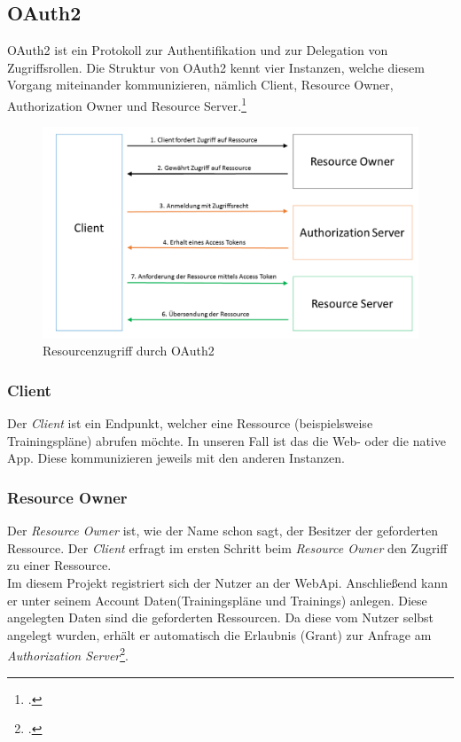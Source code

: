 \subsection{OAuth2}
\label{ssec:oauth2}
OAuth2 ist ein Protokoll zur Authentifikation und zur Delegation von Zugriffsrollen. Die Struktur von OAuth2 kennt vier Instanzen, welche diesem Vorgang miteinander kommunizieren, nämlich Client, Resource Owner, Authorization Owner und Resource Server.\footcite[S. 286]{book:AngularJs:Steyer2015} 
\begin{figure}[h]
\centering
\includegraphics[width=1\linewidth]{content/images/OAuth2}
\caption{Resourcenzugriff durch OAuth2}
\label{pic:OAuth2}
\end{figure}
\subsubsection*{Client}
Der \textit{Client} ist ein Endpunkt, welcher eine Ressource (beispielsweise Trainingspläne) abrufen möchte. In unseren Fall ist das die Web- oder die native App. Diese kommunizieren jeweils mit den anderen Instanzen.
\subsubsection*{Resource Owner}
Der \textit{Resource Owner} ist, wie der Name schon sagt, der Besitzer der geforderten Ressource. Der \textit{Client} erfragt im ersten Schritt beim \textit{Resource Owner} den Zugriff zu einer Ressource.\\
Im diesem Projekt registriert sich der Nutzer an der WebApi. Anschließend kann er unter seinem Account Daten(Trainingspläne und Trainings) anlegen. Diese angelegten Daten sind die geforderten Ressourcen. Da diese vom Nutzer selbst angelegt wurden, erhält er automatisch die Erlaubnis (\ac{Grant}) zur Anfrage am \textit{Authorization Server}\footcite{online:Implemented_OAuth_WebToken}.
